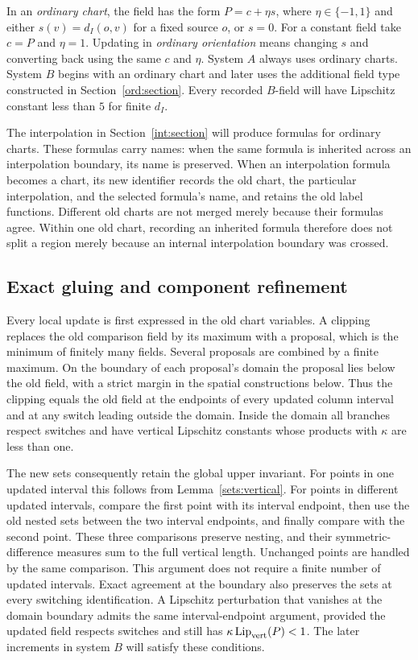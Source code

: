 In an \emph{ordinary chart}, the field has the form
$P=c+\eta s$, where $\eta\in\{-1,1\}$ and either
$s(v)=d_I(o,v)$ for a fixed source $o$, or $s=0$.
For a constant field take $c=P$ and $\eta=1$.
Updating in \emph{ordinary orientation} means changing $s$ and converting
back using the same $c$ and $\eta$. System $A$ always uses ordinary charts.
System $B$ begins with an ordinary chart and later uses the additional
field type constructed in Section~\ref{ord:section}. Every recorded
$B$-field will have Lipschitz constant less than $5$ for finite $d_I$.

The interpolation in Section~\ref{int:section} will produce formulas for
ordinary charts. These formulas carry names: when the same formula is inherited
across an interpolation boundary, its name is preserved. When an interpolation formula becomes a chart, its new identifier
records the old chart, the particular interpolation, and the selected
formula's name, and retains the old label functions. Different old charts are not merged merely
because their formulas agree. Within one old chart, recording an inherited
formula therefore does not split a region merely because an internal
interpolation boundary was crossed.

\subsection{Exact gluing and component refinement}

Every local update is first expressed in the old chart variables. A
clipping replaces the old comparison field by its maximum with a proposal,
which is the minimum of finitely many fields. Several proposals are
combined by a finite maximum. On the boundary of each proposal's
domain the proposal lies below the old field, with a strict margin in
the spatial constructions below. Thus the clipping equals the old field
at the endpoints of every updated column interval and at any switch
leading outside the domain. Inside the domain all branches respect
switches and have vertical Lipschitz constants whose products with
$\kappa$ are less than one.

The new sets consequently retain the global upper invariant. For points
in one updated interval this follows from Lemma~\ref{sets:vertical}. For
points in different updated intervals, compare the first point with its
interval endpoint, then use the old nested sets between the two interval
endpoints, and finally compare with the second point. These three
comparisons preserve nesting, and their symmetric-difference measures
sum to the full vertical length. Unchanged points are handled by the
same comparison. This argument does not require a finite number of
updated intervals. Exact agreement at the boundary also preserves the
sets at every switching identification. A Lipschitz perturbation that
vanishes at the domain boundary admits the same interval-endpoint
argument, provided the updated field respects switches and still has
$\kappa\operatorname{Lip}_{\mathrm{vert}}(P)<1$. The later increments in system $B$
will satisfy these conditions.


